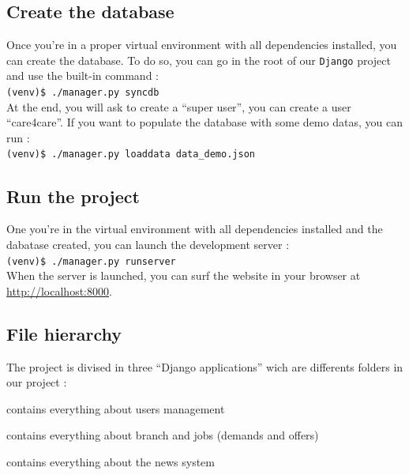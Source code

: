 \documentclass[11pt, a4paper]{article}   	%
\newcommand{\vshellcmd}[1]{\\\indent\indent\texttt{\footnotesize(venv)\$ #1}\\}
\begin{document}
\subsection{Create the database}
Once you're in a proper virtual environment with all dependencies installed, you can create the database. To do so, you can go in the root of our \texttt{Django} project and use the built-in command :
\vshellcmd{./manager.py syncdb}
At the end, you will ask to create a ``super user'', you can create a user ``care4care''. If you want to populate the database with some demo datas, you can run :
\vshellcmd{./manager.py loaddata data\_demo.json}

\subsection{Run the project}
One you're in the virtual environment with all dependencies installed and the dabatase created, you can launch the development server :
\vshellcmd{./manager.py runserver}
When the server is launched, you can surf the website in your browser at \url{http://localhost:8000}. 

\subsection{File hierarchy}
The project is divised in three ``Django applications'' wich are differents folders in our project :
\begin{description}[noitemsep]
\item[- main] contains everything about users management
\item[- branch] contains everything about branch and jobs (demands and offers)
\item[- news] contains everything about the news system
\end{description}
\end{document}
